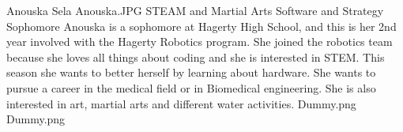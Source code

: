 \insertbio
{Anouska Sela}
{Anouska.JPG}
{STEAM and Martial Arts}
{Software and Strategy}
{Sophomore}
{
Anouska is a sophomore at Hagerty High School, and this is her 2nd year involved with the Hagerty Robotics program. She joined the robotics team because she loves all things about coding and she is interested in STEM. This season she wants to better herself by learning about hardware. She wants to pursue a career in the medical field or in Biomedical engineering. She is also interested in art, martial arts and different water activities. 
}
{Dummy.png}
{Dummy.png}
